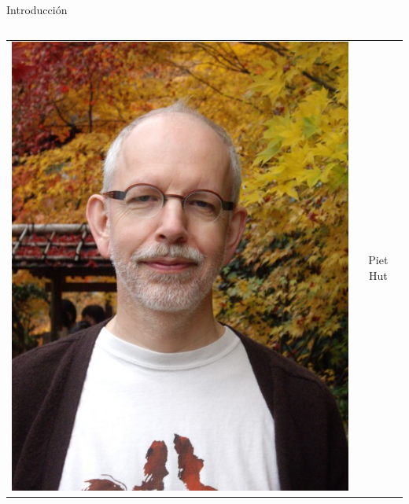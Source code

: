 \documentclass{beamer}
\begin{document}
\begin{frame}{Introducci\'on}
\begin{columns}
\begin{column}{.5\textwidth}
\begin{tabular}{cc}
				\includegraphics[height=0.3\textheight]{sources/images/hut.jpg}
				& Piet Hut \\
			\end{tabular}
		\end{column}
	\end{columns}
	
\end{frame}
\end{document}
